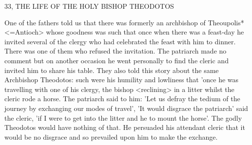 33, THE LIFE OF THE HOLY BISHOP THEODOTOS

One of the fathers told us that there was formerly an archbishop of
Theoupolis* <=Antioch> whose goodness was such that once when
there was a feast-day he invited several of the clergy who had
celebrated the feast with him to dinner.
There was one of them who
refused the invitation.
The patriarch made no comment but on
another occasion he went personally to find the cleric and invited
him to share his table.
They also told this story about the same
Archbishop Theodotos: such were his humility and lowliness that
'once he was travelling with one of his clergy, the bishop <reclining>
in a litter whilst the cleric rode a horse.
The patriarch said to him:
'Let us defray the tedium of the journey by exchanging our modes
of travel', 'It would disgrace the patriarch' said the cleric, 'if I were
to get into the litter and he to mount the horse'.
The godly
Theodotos would have nothing of that.
He persuaded his attendant
cleric that it would be no disgrace and so prevailed upon him to
make the exchange.


